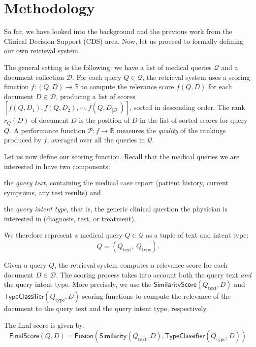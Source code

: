 \chapter{Methodology}\label{meth}

So far, we have looked into the background and the previous work from the Clinical Decision Support (CDS) area.
Now, let us proceed to formally defining our own retrieval system. 

The general setting is the following: we have a list of medical queries $\mathcal{Q}$ and a document collection $\mathcal{D}$.
For each query $Q \in \mathcal{Q}$, 
the retrieval system uses a scoring function $f:(Q,D)\rightarrow\mathbb{R}$ to compute the relevance score $f(Q,D)$ 
for each
document $D\in\mathcal{D}$, producing a list of scores $[f(Q,D_1), f(Q,D_2), \cdots, f(Q,D_{|\mathcal{D}|})]$,
sorted in descending order.
The rank $r_Q(D)$ of document $D$ is the position of $D$ in the list of sorted scores for query $Q$.
A performance function $\mathcal{P}:f\rightarrow\mathbb{R}$ measures the \emph{quality} of the rankings produced by
$f$, averaged over all the queries in $ \mathcal{Q}$.

Let us now define our scoring function.
Recall that the medical queries we are interested in have two components:
\begin{enumerate*}[label=\arabic*)]
 \item the \emph{query text}, containing the medical case report (patient history, current symptoms, any test results) and
 \item the \emph{query intent type}, that is, the generic clinical question the physician is interested in (diagnosis, test, or treatment).
\end{enumerate*}
We therefore represent a medical query $Q\in\mathcal{Q}$ as a tuple of text and intent type: \[Q = \left(Q_{\text{text}},\ Q_{\text{type}}\right).\]

Given a query $Q$, the retrieval system computes a relevance score for each document $D\in\mathcal{D}$.
The scoring process takes into account both the query text \emph{and} the query intent type. More precisely, we use the
$\textsf{SimilarityScore}(Q_{\text{text}}, D)$ and $\textsf{TypeClassifier}(Q_{\text{type}}, D)$ scoring functions to compute the relevance of the document to the query text and the
query intent type, respectively.

The final score is given by:
\begin{equation}\label{fusion}
  \textsf{FinalScore}(Q, D) = \textsf{Fusion}\left(\textsf{Similarity}(Q_{\text{text}}, D), \textsf{TypeClassifier}(Q_{\text{type}}, D)\right)
\end{equation}

